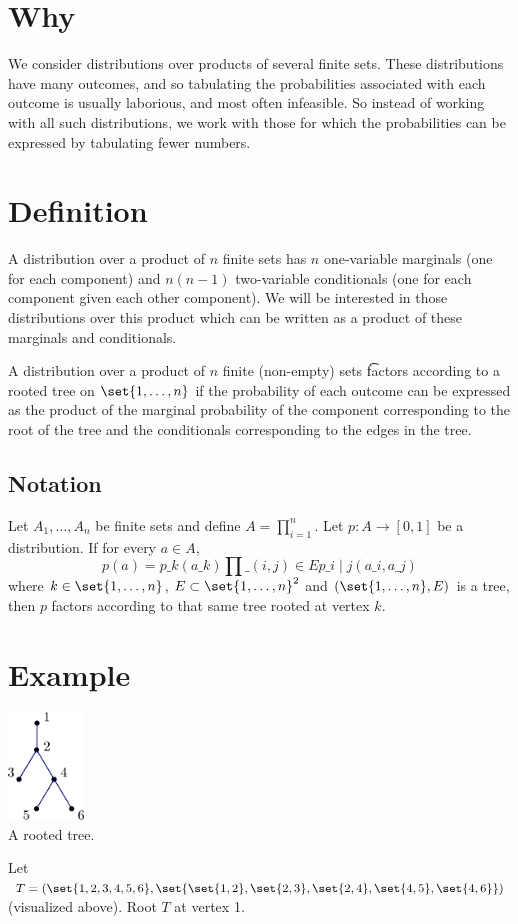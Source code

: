 
\section*{Why}

We consider distributions over products of several finite sets.
These distributions have many outcomes, and so tabulating the probabilities associated with each outcome is usually laborious, and most often infeasible.
So instead of working with all such distributions, we work with those for which the probabilities can be expressed by tabulating fewer numbers.

\section*{Definition}

A distribution over a product of $n$ finite sets has $n$ one-variable marginals (one for each component) and $n(n-1)$ two-variable conditionals (one for each component given each other component).
We will be interested in those distributions over this product which can be written as a product of these marginals and conditionals.

A distribution over a product of $n$ finite (non-empty) sets \t{factors according to a rooted tree} on $\set{1, \dots , n}$ if the probability of each outcome can be expressed as the product of the marginal probability of the component corresponding to the root of the tree and the conditionals corresponding to the edges in the tree.

\subsection*{Notation}

Let $A_1, \dots , A_n$ be finite sets and define $A = \prod_{i = 1}^{n}$.
Let $p: A \to [0, 1]$ be a distribution.
If for every $a \in A$, $$p(a) = p\_k(a\_k)\prod\_{(i, j) \in E} p\_{i \mid j}(a\_i, a\_j)$$ where $k \in \set{1, \dots , n}$, $E \subset \set{1, \dots , n}^2$ and $(\set{1, \dots , n}, E)$ is a tree, then $p$ factors according to that same tree rooted at vertex $k$.

\section*{Example}

\begin{center}\includegraphics[width=0.15\textwidth]{graphics/tree.pdf}
\\
A rooted tree.\end{center}
Let $T = (\set{1, 2, 3, 4, 5, 6}, \set{\set{1, 2}, \set{2, 3}, \set{2, 4}, \set{4, 5}, \set{4, 6}})$ (visualized above). Root $T$ at vertex 1.

